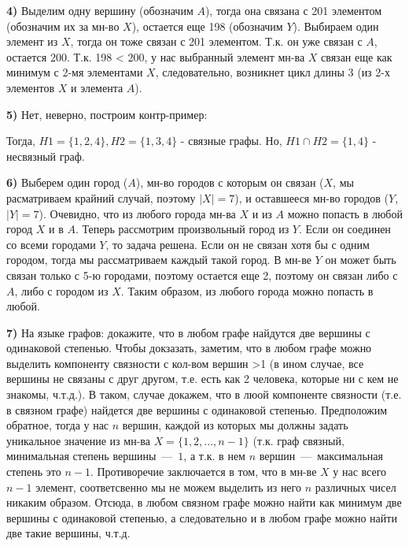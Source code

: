 \documentclass[12pt,a4paper,fleqn]{article}
\begin{document}
{\bf 4)} Выделим одну вершину (обозначим $A$), тогда она связана с 201 элементом (обозначим их за мн-во $X$), остается еще 198 (обозначим $Y$). Выбираем один элемент из $X$, тогда он тоже связан с 201 элементом. Т.к. он уже связан с $A$, остается 200. Т.к. 198 < 200, у нас выбранный элемент мн-ва $X$ связан еще как минимум с 2-мя элементами $X$, следовательно, возникнет цикл длины 3 (из 2-х элементов $X$ и элемента $A$). \newline

{\bf 5)} Нет, неверно, построим контр-пример: \newline
{} \newline
Тогда, $H1 = \{1, 2, 4\}, H2 = \{1, 3, 4\}$ - связные графы. Но, $H1 \cap H2 = \{1, 4\}$ - несвязный граф. \newline

{\bf 6)} Выберем один город ($A$), мн-во городов с которым он связан ($X$, мы расматриваем крайний случай, поэтому $|X| = 7$), и оставшееся мн-во городов ($Y$, $|Y| = 7$). Очевидно, что из любого города мн-ва $X$ и из $A$ можно попасть в любой город $X$ и в $A$. Теперь рассмотрим произвольный город из $Y$. Если он соединен со всеми городами $Y$, то задача решена. Если он не связан хотя бы с одним городом, тогда мы рассматриваем каждый такой город. В мн-ве $Y$ он может быть связан только с 5-ю городами, поэтому остается еще 2, поэтому он связан либо с $A$, либо с городом из $X$. Таким образом, из любого города можно попасть в любой. \newline

{\bf 7)} На языке графов: докажите, что в любом графе найдутся две вершины с одинаковой степенью. Чтобы докзазать, заметим, что в любом графе можно выделить компоненту связности с кол-вом вершин >1 (в ином случае, все вершины не связаны с друг другом, т.е. есть как 2 человека, которые ни с кем не знакомы, ч.т.д.). В таком, случае докажем, что в люой компоненте связности (т.е. в связном графе) найдется две вершины с одинаковой степенью. Предположим обратное, тогда у нас $n$ вершин, каждой из которых мы должны задать уникальное значение из мн-ва $X = \{1, 2, ..., n - 1\}$ (т.к. граф связный, минимальная степень вершины~---~$1$, а т.к. в нем $n$ вершин~---~максимальная степень это $n - 1$. Противоречие заключается в том, что в мн-ве $X$ у нас всего $n-1$ элемент, соответсвенно мы не можем выделить из него $n$ различных чисел никаким образом. Отсюда, в любом связном графе можно найти как минимум две вершины с одинаковой степенью, а следовательно и в любом графе можно найти две такие вершины, ч.т.д. \newline
\end{document}
